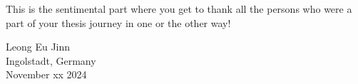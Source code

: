 
This is the sentimental part where you get to thank all the persons who were a part of your 
thesis journey in one or the other way!
		
Leong Eu Jinn\\
Ingolstadt, Germany\\
November xx 2024